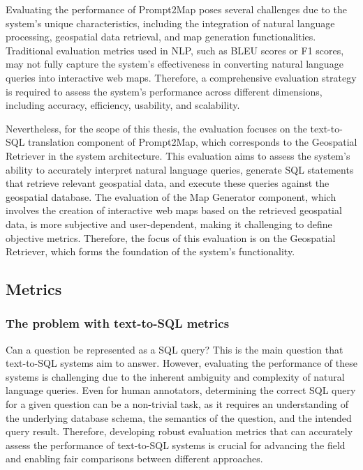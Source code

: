 
Evaluating the performance of Prompt2Map poses several challenges due to the system's unique characteristics, including the integration of natural language processing, geospatial data retrieval, and map generation functionalities. Traditional evaluation metrics used in NLP, such as BLEU scores or F1 scores, may not fully capture the system's effectiveness in converting natural language queries into interactive web maps. Therefore, a comprehensive evaluation strategy is required to assess the system's performance across different dimensions, including accuracy, efficiency, usability, and scalability.


Nevertheless, for the scope of this thesis, the evaluation focuses on the text-to-SQL translation component of Prompt2Map, which corresponds to the Geospatial Retriever in the system architecture. This evaluation aims to assess the system's ability to accurately interpret natural language queries, generate SQL statements that retrieve relevant geospatial data, and execute these queries against the geospatial database. The evaluation of the Map Generator component, which involves the creation of interactive web maps based on the retrieved geospatial data, is more subjective and user-dependent, making it challenging to define objective metrics. Therefore, the focus of this evaluation is on the Geospatial Retriever, which forms the foundation of the system's functionality.

\subsection{Metrics}

\subsubsection{The problem with text-to-SQL metrics}

Can a question be represented as a SQL query? This is the main question that text-to-SQL systems aim to answer. However, evaluating the performance of these systems is challenging due to the inherent ambiguity and complexity of natural language queries. Even for human annotators, determining the correct SQL query for a given question can be a non-trivial task, as it requires an understanding of the underlying database schema, the semantics of the question, and the intended query result. Therefore, developing robust evaluation metrics that can accurately assess the performance of text-to-SQL systems is crucial for advancing the field and enabling fair comparisons between different approaches.

